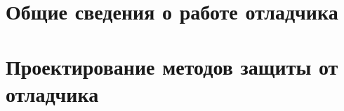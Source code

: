 


  \newpage

  \tableofcontents
  \newpage

  \chapter{Общие сведения о работе отладчика}
  
  
  
  
  
  \chapter{Проектирование методов защиты от отладчика}
  
  
  

